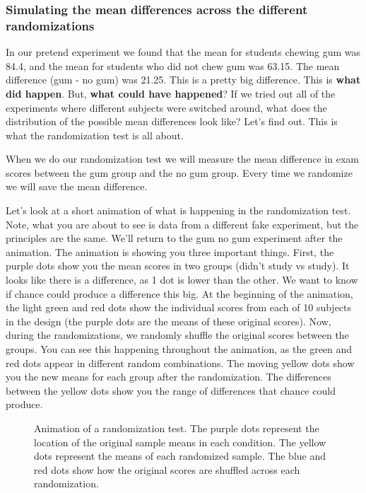 \documentclass[
]{book}
\makeatletter
\newcommand*\pandocbounded[1]{%
  \sbox\pandoc@box{#1}%
  \Gscale@div\@tempa{\textheight}{\dimexpr\ht\pandoc@box+\dp\pandoc@box\relax}%
  \Gscale@div\@tempb{\linewidth}{\wd\pandoc@box}%
  \ifdim\@tempb\p@<\@tempa\p@\let\@tempa\@tempb\fi%
  \ifdim\@tempa\p@<\p@\scalebox{\@tempa}{\usebox\pandoc@box}%
  \else\usebox{\pandoc@box}%
  \fi%
}
\makeatother
\begin{document}
\subsubsection{Simulating the mean differences across the different randomizations}\label{simulating-the-mean-differences-across-the-different-randomizations}

In our pretend experiment we found that the mean for students chewing gum was 84.4, and the mean for students who did not chew gum was 63.15. The mean difference (gum - no gum) was 21.25. This is a pretty big difference. This is \textbf{what did happen}. But, \textbf{what could have happened}? If we tried out all of the experiments where different subjects were switched around, what does the distribution of the possible mean differences look like? Let's find out. This is what the randomization test is all about.

When we do our randomization test we will measure the mean difference in exam scores between the gum group and the no gum group. Every time we randomize we will save the mean difference.

Let's look at a short animation of what is happening in the randomization test. Note, what you are about to see is data from a different fake experiment, but the principles are the same. We'll return to the gum no gum experiment after the animation. The animation is showing you three important things. First, the purple dots show you the mean scores in two groups (didn't study vs study). It looks like there is a difference, as 1 dot is lower than the other. We want to know if chance could produce a difference this big. At the beginning of the animation, the light green and red dots show the individual scores from each of 10 subjects in the design (the purple dots are the means of these original scores). Now, during the randomizations, we randomly shuffle the original scores between the groups. You can see this happening throughout the animation, as the green and red dots appear in different random combinations. The moving yellow dots show you the new means for each group after the randomization. The differences between the yellow dots show you the range of differences that chance could produce.

\begin{figure}
\centering
\pandocbounded{\texttt{[image: gifs/randomizationTest-1.gif]}}
\caption{\label{fig:5randtest}Animation of a randomization test. The purple dots represent the location of the original sample means in each condition. The yellow dots represent the means of each randomized sample. The blue and red dots show how the original scores are shuffled across each randomization.}
\end{figure}
\end{document}
